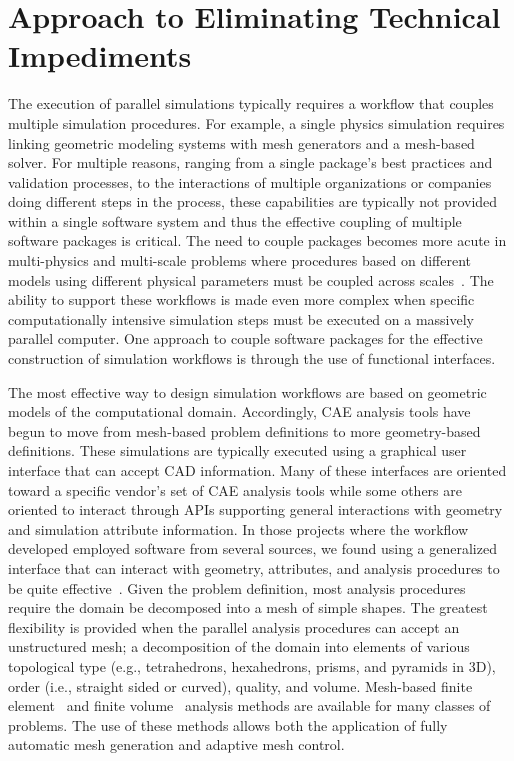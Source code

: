 \section{Approach to Eliminating Technical Impediments}\label{sec:impediments}

The execution of parallel simulations typically requires a workflow that couples
multiple simulation procedures.
For example, a single physics simulation requires linking geometric modeling
systems with mesh generators and a mesh-based solver.
For multiple reasons, ranging from a single package's best practices and
validation processes, to the interactions of multiple organizations or companies
doing different steps in the process, these capabilities are typically not provided
within a single software system and thus the effective coupling of multiple
software packages is critical.
The need to couple packages becomes more acute in multi-physics and multi-scale
problems where procedures based on different models using different
physical parameters must be coupled across
scales~\cite{amsiDelalondre2010,FrantzDale2010}.
The ability to support these workflows is made even more complex when specific
computationally intensive simulation steps must be executed on a massively
parallel computer.
One approach to couple software packages for the effective construction
of simulation workflows is through the use of functional interfaces.

The most effective way to design simulation workflows are based on geometric
models of the computational domain.
Accordingly, CAE analysis tools have begun to move from mesh-based problem
definitions to more geometry-based definitions.
These simulations are typically executed using a graphical user interface that
can accept CAD information.
Many of these interfaces are oriented toward a specific vendor's set of CAE
analysis tools while some others are oriented to interact through APIs
supporting general interactions with geometry~\cite{BeaWal} and simulation
attribute information.
In those projects where the workflow developed employed software from several
sources, we found using a generalized interface that can interact with geometry,
attributes, and analysis procedures to be quite
effective~\cite{ibanez2016pumi,tautges2001cgm,haimesEngSketchPad2013}.
Given the problem definition, most analysis procedures require the domain be
decomposed into a mesh of simple shapes.
The greatest flexibility is provided when the parallel analysis procedures can
accept an unstructured mesh; a decomposition of the domain into elements of
various topological type (e.g., tetrahedrons, hexahedrons, prisms, and pyramids
in 3D), order (i.e., straight sided or curved), quality, and volume.
Mesh-based finite element~\cite{hughes2012finite} and
finite volume~\cite{abgrallFiniteVolume2016} analysis methods are available for
many classes of problems.
The use of these methods allows both the application of fully automatic mesh
generation and adaptive mesh control.

